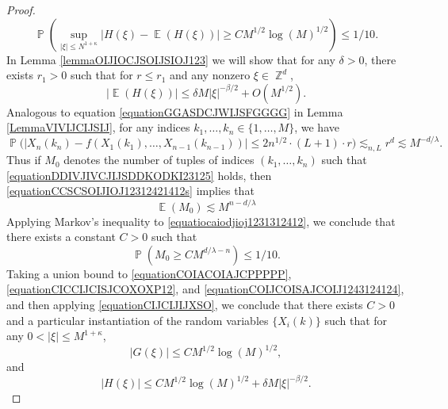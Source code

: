 \documentclass[dvipsnames,letterpaper,12pt]{article}
\numberwithin{equation}{section}
\DeclareMathOperator{\ZZ}{\mathbb{Z}}
\numberwithin{theorem}{section}
\DeclareMathOperator{\EE}{\mathbb{E}}
\DeclareMathOperator{\PP}{\mathbb{P}}
\begin{document}
\begin{proof}
    \begin{equation} \label{equationCICCIJCISJCOXOXP12}
        \PP \left( \sup_{|\xi| \leq N^{1 + \kappa}} | H(\xi) - \EE(H(\xi)) | \geq C M^{1/2} \log(M)^{1/2} \right) \leq 1/10.
    \end{equation}
    In Lemma \ref{lemmaOIJIOCJSOIJSIOJ123} we will show that for any $\delta > 0$, there exists $r_1 > 0$ such that for $r \leq r_1$ and any nonzero $\xi \in \ZZ^d$,
    \begin{equation} \label{equationCIJCIJIJXSO}
        |\EE(H(\xi))| \leq \delta M |\xi|^{-\beta/2} + O(M^{1/2}).
    \end{equation}
    Analogous to equation \eqref{equationGGASDCJWIJSFGGGG} in Lemma \ref{LemmaVIVIJCIJSIJ}, for any indices $k_1,\dots,k_n \in \{ 1, \dots, M \}$, we have
    \begin{equation} \label{equationCCSCSOIJIOJ12312421412s}
        \PP \Big( |X_n(k_n) - f(X_1(k_1),\dots,X_{n-1}(k_{n-1}))| \leq 2 n^{1/2} \cdot (L+1) \cdot r \Big) \lesssim_{n,L} r^d \lesssim M^{-d/\lambda}.
    \end{equation}
    Thus if $M_0$ denotes the number of tuples of indices $(k_1,\dots,k_n)$ such that \eqref{equationDDIVJIVCJIJSDDKODKI23125} holds, then \eqref{equationCCSCSOIJIOJ12312421412s} implies that
    \begin{equation} \label{equatiocaiodjioj1231312412}
        \EE(M_0) \lesssim M^{n-d/\lambda}
    \end{equation}
    Applying Markov's inequality to \eqref{equatiocaiodjioj1231312412}, we conclude that there exists a constant $C > 0$ such that
    \begin{equation} \label{equationCOIJCOISAJCOIJ1243124124}
        \PP(M_0 \geq C M^{d/\lambda - n}) \leq 1/10.
    \end{equation}
    Taking a union bound to \eqref{equationCOIACOIAJCPPPPP}, \eqref{equationCICCIJCISJCOXOXP12}, and \eqref{equationCOIJCOISAJCOIJ1243124124}, and then applying \eqref{equationCIJCIJIJXSO}, we conclude that there exists $C > 0$ and a particular instantiation of the random variables $\{ X_i(k) \}$ such that for any $0 < |\xi| \leq M^{1 + \kappa}$,
    \begin{equation} \label{equatioACOINAWCOWANCOIWAN}
        |G(\xi)| \leq CM^{1/2} \log(M)^{1/2},
    \end{equation}
    and
    \begin{equation} \label{equatioNCOIJCOIJOIJO12312421412}
        |H(\xi)| \leq C M^{1/2} \log(M)^{1/2} + \delta M |\xi|^{-\beta/2}.

\end{equation}
\end{proof}
\end{document}
